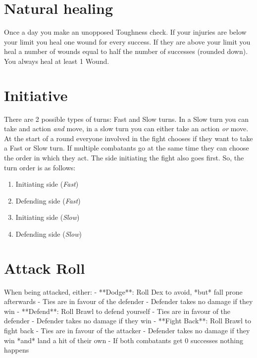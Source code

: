 \section{Natural healing}
Once a day you make an unopposed Toughness check. 
If your injuries are below your limit you heal one wound for every success. 
If they are above your limit you heal a number of wounds equal to half the number of successes (rounded down).
You always heal at least 1 Wound.

\section{Initiative}
There are 2 possible types of turns: Fast and Slow turns.  
In a Slow turn you can take and action \textit{and} move, in a slow turn you can either take an action \textit{or} move.  
At the start of a round everyone involved in the fight chooses if they want to take a Fast or Slow turn.
If multiple combatants go at the same time they can choose the order in which they act.
The side initiating the fight also goes first. So, the turn order is as follows: 

\begin{enumerate}
    \item Initiating side (\textit{Fast})
    \item Defending side (\textit{Fast})
    \item Initiating side (\textit{Slow})
    \item Defending side (\textit{Slow})
\end{enumerate}


\section{Attack Roll}

When being attacked, either:
    - **Dodge**: Roll Dex to avoid, *but* fall prone afterwards
        - Ties are in favour of the defender
        - Defender takes no damage if they win
    - **Defend**: Roll Brawl to defend yourself
        - Ties are in favour of the defender
        - Defender takes no damage if they win
    - **Fight Back**: Roll Brawl to fight back  
        - Ties are in favour of the attacker
        - Defender takes no damage if they win *and* land a hit of their own
    - If both combatants get 0 successes nothing happens 

